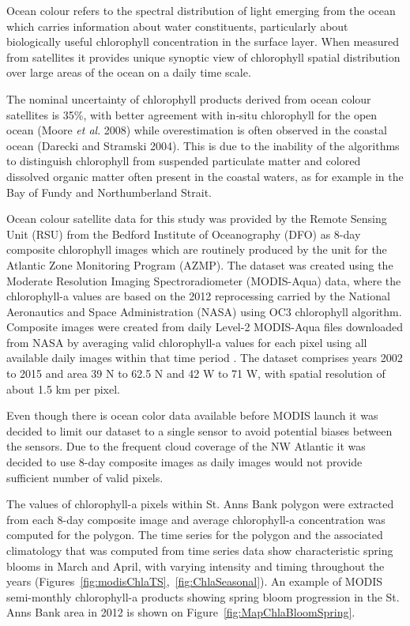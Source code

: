 \documentclass[letterpaper,portrait,11pt]{scrartcl}
\numberwithin{equation}{section}		%
\numberwithin{figure}{section}		%
\numberwithin{table}{section}				%
\begin{document}
Ocean colour refers to the spectral distribution of light emerging from the ocean which carries information about water constituents, particularly about biologically useful chlorophyll concentration in the surface layer. When measured from satellites it provides unique synoptic view of chlorophyll spatial distribution over large areas of the ocean on a daily time scale.

The nominal uncertainty of chlorophyll products derived from ocean colour satellites is 35\%, with better agreement with in-situ chlorophyll for the open ocean (Moore \textit{et al}. 2008) while overestimation is often observed in the coastal ocean (Darecki and Stramski 2004). This is due to the inability of the algorithms to distinguish chlorophyll from suspended particulate matter and colored dissolved organic matter often present in the coastal waters, as for example in the Bay of Fundy and Northumberland Strait.

Ocean colour satellite data for this study was provided by the Remote Sensing Unit (RSU) from the Bedford Institute of Oceanography (DFO) as 8-day composite chlorophyll images which are routinely produced by the unit for the Atlantic Zone Monitoring Program (AZMP). The dataset was created using the Moderate Resolution Imaging Spectroradiometer (MODIS-Aqua) data, where the chlorophyll-a values are based on the 2012 reprocessing carried by the National Aeronautics and Space Administration (NASA) using OC3 chlorophyll algorithm. Composite images were created from daily Level-2 MODIS-Aqua files downloaded from NASA by averaging valid chlorophyll-a values for each pixel using all available daily images within that time period \parencite{Caverhill:2015:modis,feldman:2015}. The dataset comprises years 2002 to 2015 and area 39 N to 62.5 N and 42 W to 71 W, with spatial resolution of about 1.5 km per pixel. 

Even though there is ocean color data available before MODIS launch it was decided to limit our dataset to a single sensor to avoid potential biases between the sensors. Due to the frequent cloud coverage of the NW Atlantic it was decided to use 8-day composite images as daily images would not provide sufficient number of valid pixels. 

The values of chlorophyll-a pixels within St. Anns Bank polygon were extracted from each 8-day composite image and average chlorophyll-a concentration was computed for the polygon. The time series for the polygon and the associated climatology that was computed from time series data show characteristic spring blooms in March and April, with varying intensity and timing throughout the years (Figures~\ref{fig:modisChlaTS},~\ref{fig:ChlaSeasonal}). An example of MODIS semi-monthly chlorophyll-a products showing spring bloom progression in the St. Anns Bank area in 2012 is shown on Figure~\ref{fig:MapChlaBloomSpring}.
\end{document}
